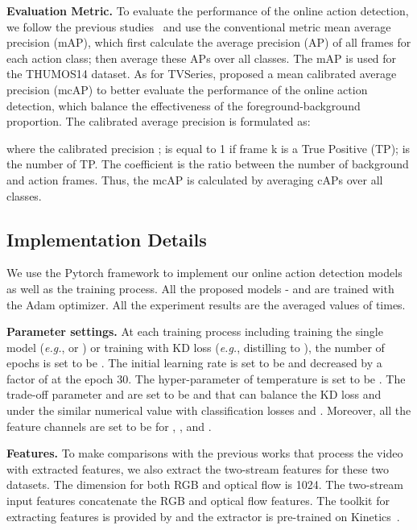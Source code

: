 \documentclass[final]{cvpr}
\begin{document}
\noindent \textbf{Evaluation Metric.}
To evaluate the performance of the online action detection, we follow the previous studies~\cite{xu2019trn,eun2020learning} and use the conventional metric mean average precision (mAP), which first calculate the average precision (AP) of all frames for each action class; then average these APs over all classes. The mAP is used for the THUMOS14 dataset. As for TVSeries, \cite{geest2016online} proposed a mean calibrated average precision (mcAP) to better evaluate the performance of the online action detection, which balance the effectiveness of the foreground-background proportion. The calibrated average precision is formulated as:

where the calibrated precision ;  is equal to 1 if frame k is a True Positive (TP);  is the number of TP. The coefficient  is the ratio between the number of background and action frames. Thus, the mcAP is calculated by averaging cAPs over all classes.


\subsection{Implementation Details}

We use the Pytorch framework \cite{paszke2017automatic} to implement our online action detection models as well as the training process. All the proposed models - and  are trained with the Adam optimizer. All the experiment results are the averaged values of  times.

\noindent \textbf{Parameter settings.}
At each training process including training the single model (\emph{e.g.},  or ) or training with KD loss (\emph{e.g.}, distilling  to ), the number of epochs is set to be . The initial learning rate is set to be  and decreased by a factor of  at the epoch 30. The hyper-parameter of temperature  is set to be . The trade-off parameter  and  are set to be  and  that can balance the KD loss  and  under the similar numerical value with classification losses  and . Moreover, all the feature channels are set to be  for , , and . 

\noindent \textbf{Features.} To make comparisons with the previous works that process the video with extracted features, we also extract the two-stream features for these two datasets. The dimension for both RGB and optical flow is 1024. The two-stream input features  concatenate the RGB and optical flow features. The toolkit for extracting features is provided by \cite{liu2019completeness} and the extractor is pre-trained on Kinetics~\cite{carreira2017quo}.
\end{document}
